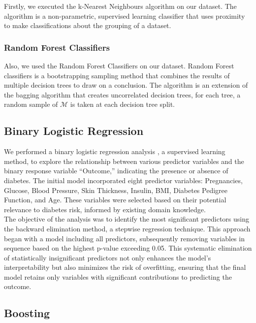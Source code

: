 \documentclass[12pt]{article}
\begin{document}
 Firstly, we executed the k-Nearest Neighbours algorithm \cite{peterson2009k} on our dataset. The algorithm is a non-parametric, supervised learning classifier that uses proximity to make classifications about the grouping of a dataset.

 \subsubsection{Random Forest Classifiers}
 
 Also, we used the Random Forest Classifiers \cite{zhou2012ensemble} on our dataset. Random Forest classifiers is a bootstrapping sampling method that combines the results of multiple decision trees to draw on a conclusion. The algorithm \cite{Lecture16} is an extension of the bagging algorithm \cite{Lecture16} that creates uncorrelated decision trees, for each tree, a random sample of $\mathcal{M}$ is taken at each decision tree split.

\subsection{Binary Logistic Regression}
We performed a binary logistic regression analysis \cite{faraway2016extending}, a supervised learning method, to explore the relationship between various predictor variables and the binary response variable “Outcome,” indicating the presence or absence of diabetes. The initial model incorporated eight predictor variables: Pregnancies, Glucose, Blood Pressure, Skin Thickness, Insulin, BMI, Diabetes Pedigree Function, and Age. These variables were selected based on their potential relevance to diabetes risk, informed by existing domain knowledge.\\
\setlength{\parindent}{0pt}
The objective of the analysis was to identify the most significant predictors using the backward elimination method, a stepwise regression technique. This approach began with a model including all predictors, subsequently removing variables in sequence based on the highest p-value exceeding 0.05. This systematic elimination of statistically insignificant predictors not only enhances the model’s interpretability but also minimizes the risk of overfitting, ensuring that the final model retains only variables with significant contributions to predicting the outcome.

\subsection{Boosting}
\end{document}
